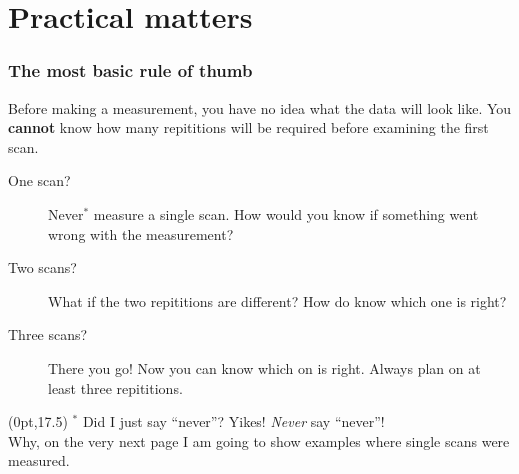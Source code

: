 \documentclass[10pt, xcolor=x11names, compress]{beamer}
\begin{document}
\section{Practical matters}

\begin{frame}
  \frametitle{The most basic rule of thumb}
  Before making a measurement, you have no idea what the data will
  look like.  You \textbf{cannot} know how many repititions will be
  required before examining the first scan.
  \begin{description}
  \item[One scan?] Never$^*$ measure a single scan.  How would you
    know if something went wrong with the measurement?
  \item[Two scans?] What if the two repititions are different?  How do
    know which one is right?
  \item[Three scans?] There you go!  Now you can know which on is
    right.  \alert{Always plan on at least three repititions.}
  \end{description}
  \begin{textblock*}{0.7\linewidth}(0pt,17.5\TPVertModule)%
    \footnotesize%
    $^*$ Did I just say ``never''?  Yikes!  \textit{Never} say
    ``never''!\\Why, on the very next page I am going to show examples
    where single scans were measured.
  \end{textblock*}
\end{frame}
\end{document}
